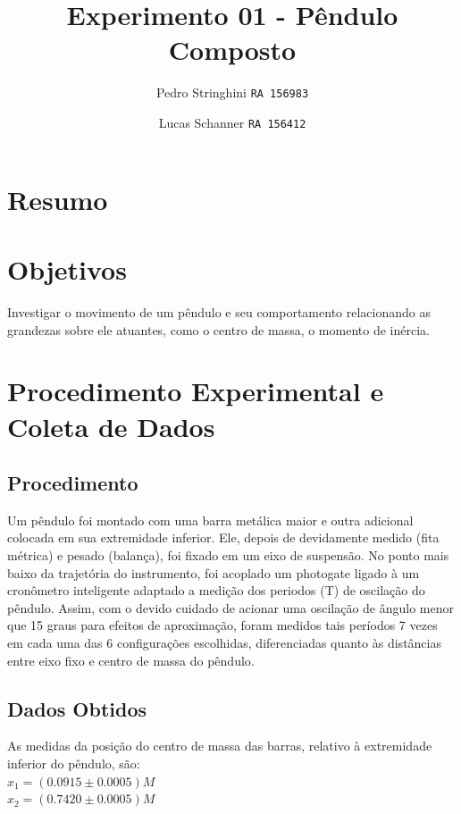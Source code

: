 \documentclass[12pt,a4paper]{article}
\begin{document}
\title{Experimento 01 - Pêndulo Composto}
\author{Pedro Stringhini 
		\texttt{RA 156983}
		\and
		Lucas Schanner 
		\texttt{RA 156412}}
\maketitle
\newpage
\section{Resumo}

\section{Objetivos}
Investigar o movimento de um pêndulo e seu comportamento relacionando as grandezas sobre ele atuantes, como o centro de massa, o momento de inércia.

\section{Procedimento Experimental e Coleta de Dados}
\subsection{Procedimento}

Um pêndulo foi montado com uma barra metálica maior e outra adicional colocada em sua extremidade inferior. Ele, depois de devidamente medido (fita métrica) e pesado (balança), foi fixado em um eixo de suspensão. No ponto mais baixo da trajetória do instrumento, foi acoplado um photogate ligado à um cronômetro inteligente adaptado a medição dos periodos (T) de oscilação do pêndulo. Assim, com o devido cuidado de acionar uma oscilação de ângulo menor que 15 graus para efeitos de aproximação, foram medidos tais períodos 7 vezes em cada uma das 6 configurações escolhidas, diferenciadas quanto às distâncias entre eixo fixo e centro de massa do pêndulo.\\

\subsection{Dados Obtidos}

As medidas da posição do centro de massa das barras, relativo à extremidade inferior do pêndulo, são: \\
$ x_1 = (0.0915 \pm 0.0005) M$\\
$ x_2 = (0.7420 \pm 0.0005) M$\\
\end{document}
